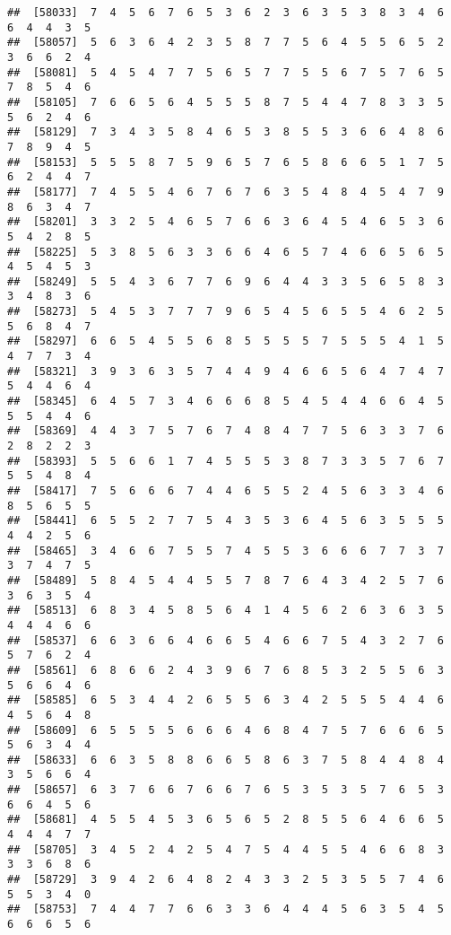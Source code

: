 \documentclass[
]{book}
\begin{document}
\begin{verbatim}
##  [58033]  7  4  5  6  7  6  5  3  6  2  3  6  3  5  3  8  3  4  6  6  4  4  3  5
##  [58057]  5  6  3  6  4  2  3  5  8  7  7  5  6  4  5  5  6  5  2  3  6  6  2  4
##  [58081]  5  4  5  4  7  7  5  6  5  7  7  5  5  6  7  5  7  6  5  7  8  5  4  6
##  [58105]  7  6  6  5  6  4  5  5  5  8  7  5  4  4  7  8  3  3  5  5  6  2  4  6
##  [58129]  7  3  4  3  5  8  4  6  5  3  8  5  5  3  6  6  4  8  6  7  8  9  4  5
##  [58153]  5  5  5  8  7  5  9  6  5  7  6  5  8  6  6  5  1  7  5  6  2  4  4  7
##  [58177]  7  4  5  5  4  6  7  6  7  6  3  5  4  8  4  5  4  7  9  8  6  3  4  7
##  [58201]  3  3  2  5  4  6  5  7  6  6  3  6  4  5  4  6  5  3  6  5  4  2  8  5
##  [58225]  5  3  8  5  6  3  3  6  6  4  6  5  7  4  6  6  5  6  5  4  5  4  5  3
##  [58249]  5  5  4  3  6  7  7  6  9  6  4  4  3  3  5  6  5  8  3  3  4  8  3  6
##  [58273]  5  4  5  3  7  7  7  9  6  5  4  5  6  5  5  4  6  2  5  5  6  8  4  7
##  [58297]  6  6  5  4  5  5  6  8  5  5  5  5  7  5  5  5  4  1  5  4  7  7  3  4
##  [58321]  3  9  3  6  3  5  7  4  4  9  4  6  6  5  6  4  7  4  7  5  4  4  6  4
##  [58345]  6  4  5  7  3  4  6  6  6  8  5  4  5  4  4  6  6  4  5  5  5  4  4  6
##  [58369]  4  4  3  7  5  7  6  7  4  8  4  7  7  5  6  3  3  7  6  2  8  2  2  3
##  [58393]  5  5  6  6  1  7  4  5  5  5  3  8  7  3  3  5  7  6  7  5  5  4  8  4
##  [58417]  7  5  6  6  6  7  4  4  6  5  5  2  4  5  6  3  3  4  6  8  5  6  5  5
##  [58441]  6  5  5  2  7  7  5  4  3  5  3  6  4  5  6  3  5  5  5  4  4  2  5  6
##  [58465]  3  4  6  6  7  5  5  7  4  5  5  3  6  6  6  7  7  3  7  3  7  4  7  5
##  [58489]  5  8  4  5  4  4  5  5  7  8  7  6  4  3  4  2  5  7  6  3  6  3  5  4
##  [58513]  6  8  3  4  5  8  5  6  4  1  4  5  6  2  6  3  6  3  5  4  4  4  6  6
##  [58537]  6  6  3  6  6  4  6  6  5  4  6  6  7  5  4  3  2  7  6  5  7  6  2  4
##  [58561]  6  8  6  6  2  4  3  9  6  7  6  8  5  3  2  5  5  6  3  5  6  6  4  6
##  [58585]  6  5  3  4  4  2  6  5  5  6  3  4  2  5  5  5  4  4  6  4  5  6  4  8
##  [58609]  6  5  5  5  5  6  6  6  4  6  8  4  7  5  7  6  6  6  5  5  6  3  4  4
##  [58633]  6  6  3  5  8  8  6  6  5  8  6  3  7  5  8  4  4  8  4  3  5  6  6  4
##  [58657]  6  3  7  6  6  7  6  6  7  6  5  3  5  3  5  7  6  5  3  6  6  4  5  6
##  [58681]  4  5  5  4  5  3  6  5  6  5  2  8  5  5  6  4  6  6  5  4  4  4  7  7
##  [58705]  3  4  5  2  4  2  5  4  7  5  4  4  5  5  4  6  6  8  3  3  3  6  8  6
##  [58729]  3  9  4  2  6  4  8  2  4  3  3  2  5  3  5  5  7  4  6  5  5  3  4  0
##  [58753]  7  4  4  7  7  6  6  3  3  6  4  4  4  5  6  3  5  4  5  6  6  6  5  6

\end{verbatim}
\end{document}

